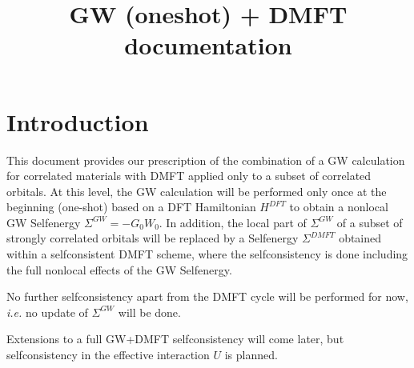 \documentclass[12pt,a4paper]{scrartcl}
\title{GW (oneshot) + DMFT documentation}
\numberwithin{equation}{section}
\newcommand{\GF}{Green's function}
\begin{document}
\maketitle
\tableofcontents

\clearpage

\section{Introduction}

This document  provides our prescription of the combination of a GW calculation 
for correlated materials with DMFT applied only to a subset of correlated 
orbitals. At this level, the GW calculation will be performed only once at the 
beginning (one-shot) based on a DFT Hamiltonian $H^{DFT}$ to obtain a nonlocal 
GW Selfenergy $\Sigma^{GW}=-G_0W_0$. In addition, the local part of 
$\Sigma^{GW}$ of a subset of strongly correlated orbitals will be replaced by a 
Selfenergy $\Sigma^{DMFT}$ obtained within a selfconsistent DMFT scheme, where 
the selfconsistency is done including the full nonlocal effects of the GW
Selfenergy.

No further selfconsistency apart from the DMFT cycle will be performed for now, 
{\it i.e.} no update of $\Sigma^{GW}$ will be done. 

Extensions to a full GW+DMFT selfconsistency will come later,
but selfconsistency in the effective interaction $U$ is planned.
\end{document}
